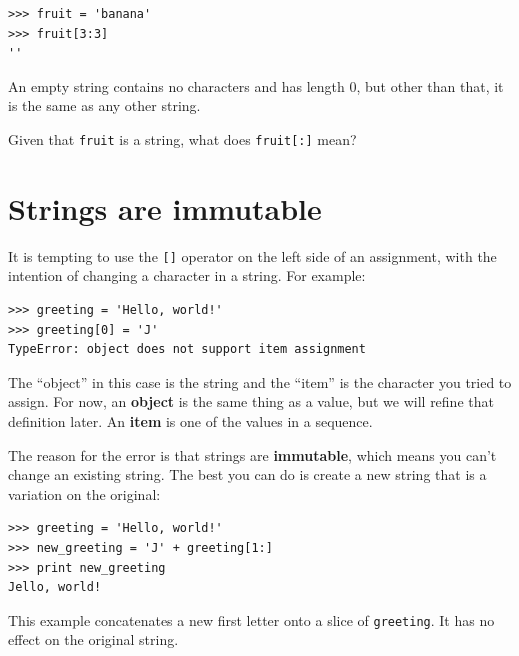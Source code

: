 \documentclass[10pt]{book}
\begin{document}

\beforeverb
\begin{verbatim}
>>> fruit = 'banana'
>>> fruit[3:3]
''
\end{verbatim}
\afterverb
%
An empty string contains no characters and has length 0, but other
than that, it is the same as any other string.

\begin{ex}
Given that {\tt fruit} is a string, what does
{\tt fruit[:]} mean?



\end{ex}


\section{Strings are immutable}

It is tempting to use the {\tt []} operator on the left side of an
assignment, with the intention of changing a character in a string.
For example:


\beforeverb
\begin{verbatim}
>>> greeting = 'Hello, world!'
>>> greeting[0] = 'J'
TypeError: object does not support item assignment
\end{verbatim}
\afterverb
%
The ``object'' in this case is the string and the ``item'' is
the character you tried to assign.  For now, an {\bf object} is
the same thing as a value, but we will refine that definition
later.  An {\bf item} is one of the values in a sequence.


The reason for the error is that
strings are {\bf immutable}, which means you can't change an
existing string.  The best you can do is create a new string
that is a variation on the original:

\beforeverb
\begin{verbatim}
>>> greeting = 'Hello, world!'
>>> new_greeting = 'J' + greeting[1:]
>>> print new_greeting
Jello, world!
\end{verbatim}
\afterverb
%
This example concatenates a new first letter onto
a slice of {\tt greeting}.  It has no effect on
the original string.

\end{document}
